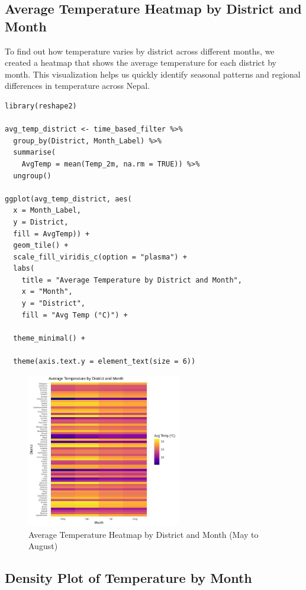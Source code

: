 \subsection*{Average Temperature Heatmap by District and Month}

To find out how temperature varies by district across different months, we created a heatmap that shows the average temperature for each district by month. This visualization helps us quickly identify seasonal patterns and regional differences in temperature across Nepal.
\begin{verbatim}
library(reshape2)

avg_temp_district <- time_based_filter %>%
  group_by(District, Month_Label) %>%
  summarise(
    AvgTemp = mean(Temp_2m, na.rm = TRUE)) %>%
  ungroup()

ggplot(avg_temp_district, aes(
  x = Month_Label, 
  y = District, 
  fill = AvgTemp)) +
  geom_tile() +
  scale_fill_viridis_c(option = "plasma") +
  labs(
    title = "Average Temperature by District and Month",
    x = "Month", 
    y = "District", 
    fill = "Avg Temp (°C)") +

  theme_minimal() +

  theme(axis.text.y = element_text(size = 6))
\end{verbatim}

\begin{figure}[h]
    \centering
    \includegraphics[width=0.6\textwidth]{figures/heatmap_time.jpg}
    \caption{Average Temperature Heatmap by District and Month (May to August)}
    \label{fig:avg_temp_heatmap}
\end{figure}

\subsection*{Density Plot of Temperature by Month}

